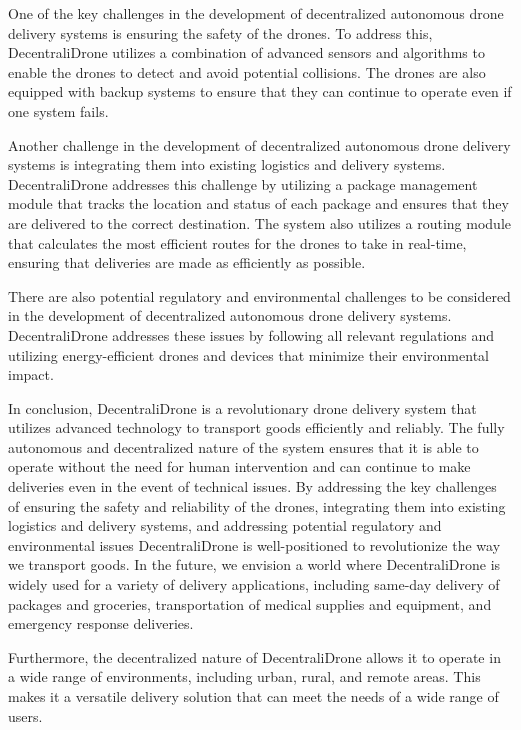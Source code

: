 \documentclass[conference]{IEEEtran}
\begin{document}
One of the key challenges in the development of decentralized autonomous drone delivery systems is ensuring the safety of the drones. To address this, DecentraliDrone utilizes a combination of advanced sensors and algorithms to enable the drones to detect and avoid potential collisions. The drones are also equipped with backup systems to ensure that they can continue to operate even if one system fails.

Another challenge in the development of decentralized autonomous drone delivery systems is integrating them into existing logistics and delivery systems. DecentraliDrone addresses this challenge by utilizing a package management module that tracks the location and status of each package and ensures that they are delivered to the correct destination. The system also utilizes a routing module that calculates the most efficient routes for the drones to take in real-time, ensuring that deliveries are made as efficiently as possible.

There are also potential regulatory and environmental challenges to be considered in the development of decentralized autonomous drone delivery systems. DecentraliDrone addresses these issues by following all relevant regulations and utilizing energy-efficient drones and devices that minimize their environmental impact.

In conclusion, DecentraliDrone is a revolutionary drone delivery system that utilizes advanced technology to transport goods efficiently and reliably. The fully autonomous and decentralized nature of the system ensures that it is able to operate without the need for human intervention and can continue to make deliveries even in the event of technical issues. By addressing the key challenges of ensuring the safety and reliability of the drones, integrating them into existing logistics and delivery systems, and addressing potential regulatory and environmental issues DecentraliDrone is well-positioned to revolutionize the way we transport goods. In the future, we envision a world where DecentraliDrone is widely used for a variety of delivery applications, including same-day delivery of packages and groceries, transportation of medical supplies and equipment, and emergency response deliveries.

Furthermore, the decentralized nature of DecentraliDrone allows it to operate in a wide range of environments, including urban, rural, and remote areas. This makes it a versatile delivery solution that can meet the needs of a wide range of users.
\end{document}
